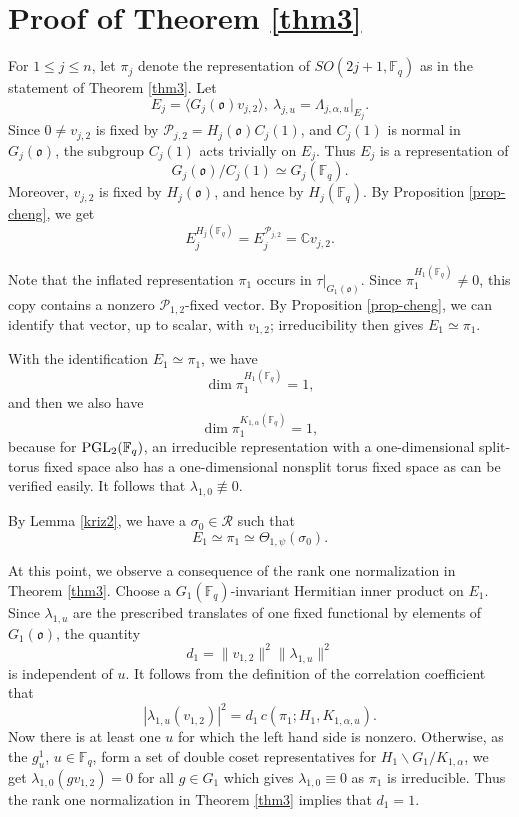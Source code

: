 \documentclass[12pt]{amsart}
\theoremstyle{definition}
\theoremstyle{remark}
\begin{document}
\section{Proof of Theorem \ref{thm3}}

For $1\le j\le n$, let $\pi_j$ denote the representation of $SO(2j+1,\mathbb F_q)$ as in the statement of Theorem \ref{thm3}. Let 
\[
E_j=\big\langle G_j(\mathfrak o)v_{j,2}\big\rangle,~
\lambda_{j,u}=\Lambda_{j,\alpha,u}|_{E_j}.
\]
Since $0 \neq v_{j,2}$ is fixed by
$\mathcal P_{j,2}=H_j(\mathfrak o)C_j(1)$, and $C_j(1)$ is normal in $G_j(\mathfrak o)$, the subgroup $C_j(1)$ acts trivially on $E_j$. Thus $E_j$ is a representation of
\[
G_j(\mathfrak o)/C_j(1)\simeq G_j(\mathbb F_q).
\]
Moreover, $v_{j,2}$ is fixed by $H_j(\mathfrak o)$, and hence by $H_j(\mathbb F_q)$. By Proposition \ref{prop-cheng}, we get 
\[
E_j^{H_j(\mathbb F_q)}
=E_j^{\mathcal P_{j,2}}
=\mathbb C v_{j,2}.
\]

Note that the inflated representation $\pi_1$ occurs in $\tau|_{G_1(\mathfrak o)}$. Since $\pi_1^{H_1(\mathbb F_q)}\ne0$, this copy contains a nonzero $\mathcal P_{1,2}$-fixed vector. By Proposition \ref{prop-cheng}, we can identify that vector, up to scalar, with $v_{1,2}$; irreducibility then gives $E_1\simeq\pi_1$. 

With the identification $E_1\simeq\pi_1$, we have 
\[
\dim\pi_1^{H_1(\mathbb F_q)}=1,
\]
and then we also have
\[
\dim\pi_1^{K_{1,\alpha}(\mathbb F_q)}=1,
\]
because for ${\rm PGL}_2(\mathbb F_q)$, an irreducible representation with a one-dimensional split-torus fixed space also has a one-dimensional nonsplit torus fixed space as can be verified easily. It follows that $\lambda_{1,0} \not\equiv 0$. 

By Lemma \ref{kriz2}, we have a $\sigma_0\in\mathcal R$ such that
\[
E_1\simeq \pi_1 \simeq \Theta_{1,\psi}(\sigma_0).
\]

At this point, we observe a consequence of the rank one normalization in Theorem \ref{thm3}. Choose a $G_1(\mathbb F_q)$-invariant Hermitian inner product on $E_1$. Since $\lambda_{1,u}$ are the prescribed translates of one fixed functional by elements of $G_1(\mathfrak o)$, the quantity
\[
d_1=\|v_{1,2}\|^2\|\lambda_{1,u}\|^2
\]
is independent of $u$. It follows from the definition of the correlation coefficient that
\[
|\lambda_{1,u}(v_{1,2})|^2
=d_1\,c(\pi_1;H_1,K_{1,\alpha,u}).
\]
Now there is at least one $u$ for which the left hand side is nonzero. Otherwise, 
as the $g_u^1$, $u \in \mathbb F_q$, form a set of double coset representatives for $H_1\backslash G_1/ K_{1,\alpha}$, we get $\lambda_{1,0}(gv_{1,2})=0$ for all $g \in G_1$ which gives $\lambda_{1,0} \equiv 0$ as $\pi_1$ is irreducible. Thus the rank one normalization in Theorem \ref{thm3} implies that $d_1=1$.
\end{document}
